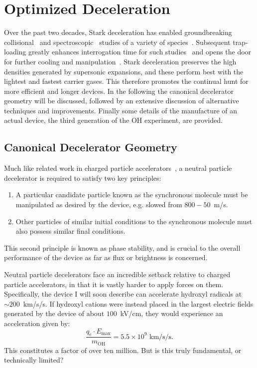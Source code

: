 \ifx\justbeingincluded\undefined

\fi

\chapter{Optimized Deceleration}
\label{chapter:slowing}

Over the past two decades, Stark deceleration has enabled groundbreaking collisional~\cite{Sawyer2011,Kirste2012,Gao2018} and spectroscopic~\cite{Veldhoven2004,Hudson2006,Lev2006,Fast2018} studies of a variety of species~\cite{VanDeMeerakker2012}. 
Subsequent trap-loading greatly enhances interrogation time for such studies~\cite{Sawyer2008} and opens the door for further cooling and manipulation~\cite{Stuhl2012evap, Reens2017}. 
Stark deceleration preserves the high densities generated by supersonic expansions, and these perform best with the lightest and fastest carrier gases.
This therefore promotes the continual hunt for more efficient and longer devices.
In the following the canonical decelerator geometry will be discussed, followed by an extensive discussion of alternative techniques and improvements.
Finally some details of the manufacture of an actual device, the third generation of the OH experiment, are provided.


\section{Canonical Decelerator Geometry}

Much like related work in charged particle accelerators~\cite{McMillan1945}, a neutral particle decelerator is required to satisfy two key principles:
\begin{enumerate}
\item A particular candidate particle known as the synchronous molecule must be manipulated as desired by the device, e.g. slowed from $800-50$~m/s.
\item Other particles of similar initial conditions to the synchronous molecule must also possess similar final conditions.
\end{enumerate}
This second principle is known as phase stability, and is crucial to the overall performance of the device as far as flux or brightness is concerned.

Neutral particle decelerators face an incredible setback relative to charged particle accelerators, in that it is vastly harder to apply forces on them.
Specifically, the device I will soon describe can accelerate hydroxyl radicals at $\sim 200$~km/s/s. 
If hydroxyl cations were instead placed in the largest electric fields generated by the device of about $100$~kV/cm, they would experience an acceleration given by:
\begin{equation}
\frac{q_e\cdot E_\text{max} }{m_\text{OH}} = 5.5\times 10^9\text{ km/s/s}.
\end{equation}
This constitutes a factor of over ten million. 
But is this truly fundamental, or technically limited? 

